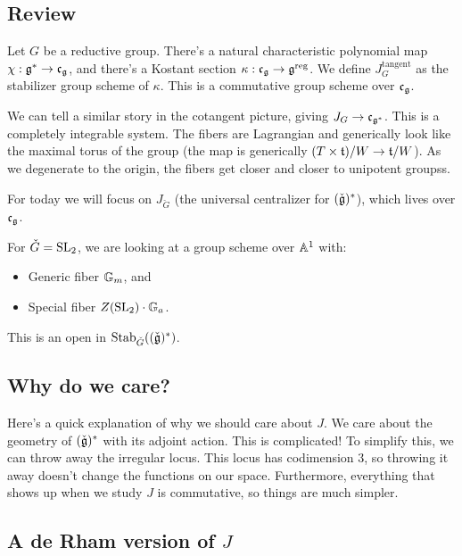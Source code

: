 \documentclass{article}
\begin{document}
\subsection{Review}

Let $G$ be a reductive group.
There's a natural characteristic polynomial map $\chi: \gfr^* \to \cfr_\gfr$, and there's a Kostant section $\kappa: \cfr_\gfr \to \gfr^\reg$.
We define $J_G^{\textrm{tangent}}$ as the stabilizer group scheme of $\kappa$.
This is a commutative group scheme over $\cfr_\gfr$.

We can tell a similar story in the cotangent picture, giving $J_G \to \cfr_{\gfr^*}$.
This is a completely integrable system.
The fibers are Lagrangian and generically look like the maximal torus of the group (the map is generically $(T \times \tfr) / W \to \tfr / W$).
As we degenerate to the origin, the fibers get closer and closer to unipotent groupss.

For today we will focus on $J_{\check{G}}$ (the universal centralizer for $(\check{\gfr})^*$), which lives over $\cfr_\gfr$.

\begin{ex}
  For $\check{G} = \SL_2$, we are looking at a group scheme over $\AA^1$ with:
  \begin{itemize}
    \item Generic fiber $\GG_m$, and
    \item Special fiber $Z(\SL_2) \cdot \GG_a$.
  \end{itemize}
  This is an open in $\Stab_{\check{G}}((\check{\gfr})^*)$.
\end{ex}

\subsection{Why do we care?}

Here's a quick explanation of why we should care about $J$.
We care about the geometry of $(\check{\gfr})^*$ with its adjoint action.
This is complicated!
To simplify this, we can throw away the irregular locus.
This locus has codimension $3$, so throwing it away doesn't change the functions on our space.
Furthermore, everything that shows up when we study $J$ is commutative, so things are much simpler.

\subsection{A de Rham version of $J$}
\end{document}
